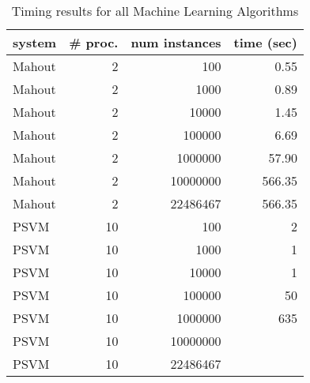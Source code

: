 \begin{table}
\begin{tabular}{|l|r|r|r|}
\hline
 system  &  \# proc.  &  num instances  &  time (sec)  \\
\hline
 Mahout  &     2          &            100  &       0.55  \\
 Mahout  &     2          &           1000  &       0.89  \\
 Mahout  &     2          &          10000  &       1.45  \\
 Mahout  &     2          &         100000  &       6.69  \\
 Mahout  &     2          &        1000000  &      57.90  \\
 Mahout  &     2          &       10000000  &     566.35  \\
 Mahout  &     2          &       22486467  &     566.35  \\
\hline
 PSVM     &           10  &            100  &     2  \\
 PSVM     &           10  &           1000  &     1  \\
 PSVM     &           10  &          10000  &     1  \\
 PSVM     &           10  &         100000  &     50  \\
 PSVM     &           10  &        1000000  &     635  \\
 PSVM     &           10  &       10000000  &       \\
 PSVM     &           10  &       22486467  &       \\
\hline
\end{tabular}
\caption{Timing results for all Machine Learning Algorithms}
\label{table:machineLearningTiming1}
\end{table}

